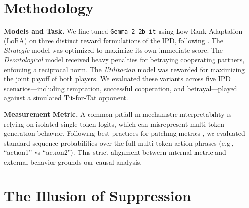 \documentclass[11pt, letterpaper]{article}
\begin{document}

\section{Methodology}

\textbf{Models and Task.} We fine-tuned \texttt{Gemma-2-2b-it} using Low-Rank Adaptation (LoRA) on three distinct reward formulations of the IPD, following \citet{tennant2024moral}. The \textit{Strategic} model was optimized to maximize its own immediate score. The \textit{Deontological} model received heavy penalties for betraying cooperating partners, enforcing a reciprocal norm. The \textit{Utilitarian} model was rewarded for maximizing the joint payoff of both players. We evaluated these variants across five IPD scenarios---including temptation, successful cooperation, and betrayal---played against a simulated Tit-for-Tat opponent.

\textbf{Measurement Metric.} A common pitfall in mechanistic interpretability is relying on isolated single-token logits, which can misrepresent multi-token generation behavior. Following best practices for patching metrics \citep{heimersheim2024activation, zhang2024best}, we evaluated standard sequence probabilities over the full multi-token action phrases (e.g., ``action1'' vs ``action2''). This strict alignment between internal metric and external behavior grounds our causal analysis.

\section{The Illusion of Suppression}
\label{sec:illusion}
\end{document}
